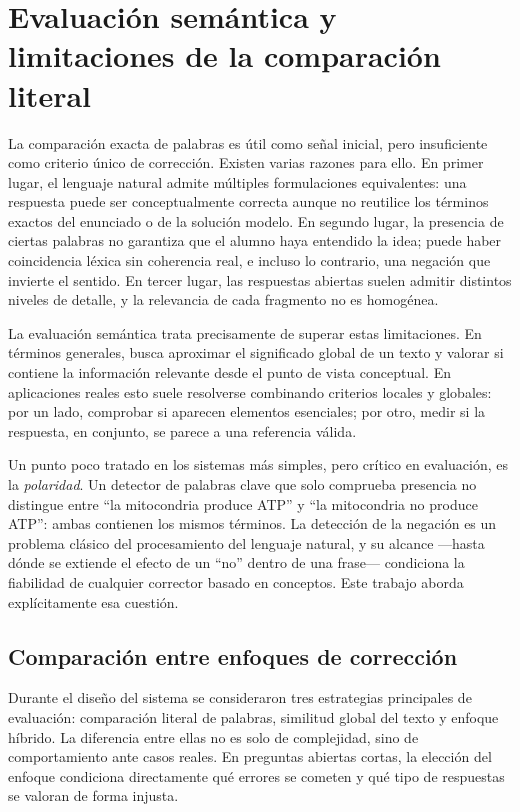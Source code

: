 \section{Evaluación semántica y limitaciones de la comparación literal}

La comparación exacta de palabras es útil como señal inicial, pero insuficiente como criterio único de corrección. Existen varias razones para ello. En primer lugar, el lenguaje natural admite múltiples formulaciones equivalentes: una respuesta puede ser conceptualmente correcta aunque no reutilice los términos exactos del enunciado o de la solución modelo. En segundo lugar, la presencia de ciertas palabras no garantiza que el alumno haya entendido la idea; puede haber coincidencia léxica sin coherencia real, e incluso lo contrario, una negación que invierte el sentido. En tercer lugar, las respuestas abiertas suelen admitir distintos niveles de detalle, y la relevancia de cada fragmento no es homogénea.

La evaluación semántica trata precisamente de superar estas limitaciones. En términos generales, busca aproximar el significado global de un texto y valorar si contiene la información relevante desde el punto de vista conceptual. En aplicaciones reales esto suele resolverse combinando criterios locales y globales: por un lado, comprobar si aparecen elementos esenciales; por otro, medir si la respuesta, en conjunto, se parece a una referencia válida.

Un punto poco tratado en los sistemas más simples, pero crítico en evaluación, es la \emph{polaridad}. Un detector de palabras clave que solo comprueba presencia no distingue entre ``la mitocondria produce ATP'' y ``la mitocondria no produce ATP'': ambas contienen los mismos términos. La detección de la negación es un problema clásico del procesamiento del lenguaje natural, y su alcance —hasta dónde se extiende el efecto de un ``no'' dentro de una frase— condiciona la fiabilidad de cualquier corrector basado en conceptos. Este trabajo aborda explícitamente esa cuestión.

\subsection{Comparación entre enfoques de corrección}

Durante el diseño del sistema se consideraron tres estrategias principales de evaluación: comparación literal de palabras, similitud global del texto y enfoque híbrido. La diferencia entre ellas no es solo de complejidad, sino de comportamiento ante casos reales. En preguntas abiertas cortas, la elección del enfoque condiciona directamente qué errores se cometen y qué tipo de respuestas se valoran de forma injusta.

